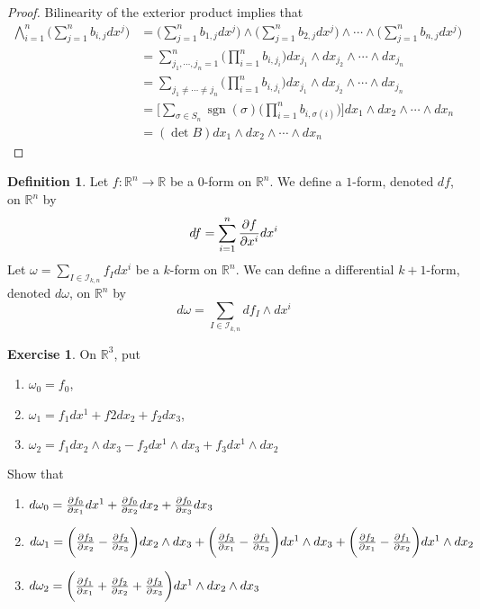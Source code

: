 \documentclass[12pt]{amsart}
\theoremstyle{definition}
\newtheorem{defn}[definition]{Definition}
\newtheorem{ex}[definition]{Exercise}
\newcommand{\sig}{\sigma}
\newcommand{\om}{\omega}
\newcommand{\R}{\mathbb{R}}
\newcommand{\MI}{\mathcal{I}}
\DeclareMathOperator{\sgn}{sgn}
\begin{document}
	\begin{proof}
		Bilinearity of the exterior product implies that
		\begin{align*}
			\bigwedge_{i=1}^n \bigg(\sum_{j=1}^n b_{i,j}dx^j\bigg)
			 &=\bigg(\sum_{j=1}^n b_{1,j}dx^j\bigg) \wedge \bigg(\sum_{j=1}^n b_{2,j}dx^j\bigg) \wedge \cdots \wedge \bigg(\sum_{j=1}^n b_{n,j}dx^j\bigg) \\
			 &= \sum_{j_1, \cdots, j_n = 1}^n \bigg( \prod_{i=1}^n b_{i, j_i} \bigg) dx_{j_1}\wedge  dx_{j_2} \wedge \cdots \wedge  dx_{j_n} \\
			 &= \sum_{j_1 \neq \cdots \neq j_n} \bigg( \prod_{i=1}^n b_{i, j_i} \bigg) dx_{j_1}\wedge  dx_{j_2} \wedge \cdots \wedge  dx_{j_n} \\
			 &= \bigg[ \sum_{\sig \in S_n} \sgn(\sig) \bigg(\prod_{i=1}^n b_{i, \sig(i)} \bigg) \bigg] dx_{1}\wedge  dx_{2} \wedge \cdots \wedge  dx_{n} \\
			 &= (\det B) dx_{1}\wedge  dx_{2} \wedge \cdots \wedge  dx_{n}
		\end{align*} 
		
	\end{proof}

	\begin{defn}
		Let $f: \R^n \rightarrow \R$ be a $0$-form on $\R^n$. We define a $1$-form, denoted $df$, on $\R^n$ by $$df = \sum_{i = 1}^n \pdv{f}{x^i} dx^i$$
		Let $\om = \sum\limits_{I \in \MI_{k,n}} f_Idx^i$ be a $k$-form on $\R^n$. We can define a differential $k+1$-form, denoted $d \om$, on $\R^n$ by $$d\om = \sum\limits_{I \in \MI_{k,n}} df_I\wedge dx^i$$  
	\end{defn}

	\begin{ex}
		On $\R^3$, put 
		\begin{enumerate}
			\item $\om_0 = f_0$, 
			\item $\om_1 = f_1 dx^1 + f2 dx_2 + f_2 dx_3$, 
			\item $\om_2 = f_1dx_2\wedge dx_3 - f_2 dx^1 \wedge dx_3 + f_3 dx^1 \wedge dx_2$
		\end{enumerate} 
		Show that
		\begin{enumerate}
			\item $d\om_0 = \pdv{f_0}{x_1}dx^1 + \pdv{f_0}{x_2}dx_2 + \pdv{f_0}{x_3}dx_3$
			\item $d \om_1 = \bigg(\pdv{f_3}{x_2} - \pdv{f_2}{x_3} \bigg) dx_2 \wedge dx_3 + \bigg( \pdv{f_3}{x_1} - \pdv{f_1}{x_3}\bigg)dx^1 \wedge dx_3 + \bigg( \pdv{f_2}{x_1} - \pdv{f_1}{x_2} \bigg) dx^1 \wedge dx_2$
			\item $d \om_2 = \bigg( \pdv{f_1}{x_1} + \pdv{f_2}{x_2} + \pdv{f_3}{x_3} \bigg) dx^1 \wedge dx_2 \wedge dx_3$ 
		\end{enumerate}
	\end{ex}
\end{document}

